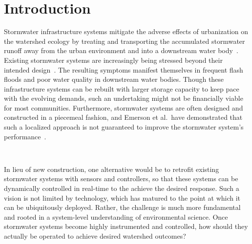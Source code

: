 \chapter{Introduction}\label{ch:introduction}
Stormwater infrastructure systems mitigate the adverse effects of urbanization on the watershed ecology by treating and transporting the accumulated stormwater runoff away from the urban environment and into a downstream water body~\cite{national2009urban}.
Existing stormwater systems are increasingly being stressed beyond their intended design~\cite{Kerkez2016SmarterSystems, national2009urban}.
The resulting symptoms manifest themselves in frequent flash floods\cite{LarisKarklisBefore-and-afterPost} and poor water quality in downstream water bodies\cite{Watson2016TheHypoxia}.
Though these infrastructure systems can be rebuilt with larger storage capacity to keep pace with the evolving demands, such an undertaking might not be financially viable for most communities\cite{Kerkez2016SmarterSystems}.
Furthermore, stormwater systems are often designed and constructed in a piecemeal fashion, and Emerson et al.\ have demonstrated that such a localized approach is not guaranteed to improve the stormwater system's performance~\cite{Emerson2005Watershed-ScaleBasins}.

\

In lieu of new construction, one alternative would be to retrofit existing stormwater systems with sensors and controllers, so that these systems can be dynamically controlled in real-time to the achieve the desired response\cite{Kerkez2016SmarterSystems, Mullapudi2017}. 
Such a vision is not limited by technology, which has matured to the point at which it can be ubiquitously deployed\cite{Bartos_2018}.
Rather, the challenge is much more fundamental and rooted in a system-level understanding of environmental science.
Once stormwater systems become highly instrumented and controlled, how should they actually be operated to achieve desired watershed outcomes?

\

